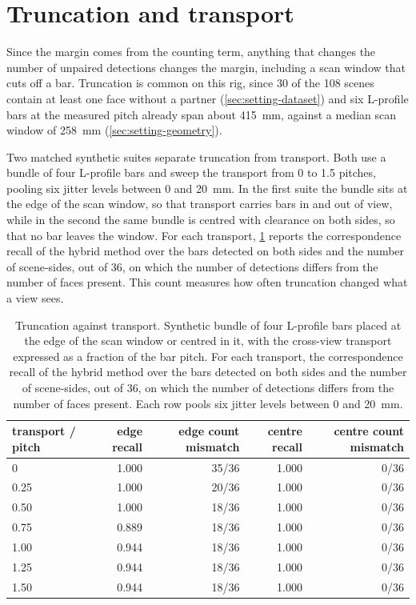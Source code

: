 \documentclass[a4paper, 12pt, twoside]{book}
\begin{document}
\section{Truncation and transport}
\label{sec:ambiguity-truncation}

Since the margin comes from the counting term, anything that changes the number of unpaired detections changes the margin, including a scan window that cuts off a bar. Truncation is common on this rig, since 30 of the 108 scenes contain at least one face without a partner (\cref{sec:setting-dataset}) and six L-profile bars at the measured pitch already span about 415~mm, against a median scan window of 258~mm (\cref{sec:setting-geometry}).

Two matched synthetic suites separate truncation from transport. Both use a bundle of four L-profile bars and sweep the transport from 0 to 1.5 pitches, pooling six jitter levels between 0 and 20~mm. In the first suite the bundle sits at the edge of the scan window, so that transport carries bars in and out of view, while in the second the same bundle is centred with clearance on both sides, so that no bar leaves the window. For each transport, \cref{tab:placement} reports the correspondence recall of the hybrid method over the bars detected on both sides and the number of scene-sides, out of 36, on which the number of detections differs from the number of faces present. This count measures how often truncation changed what a view sees.

\begin{table}[htbp]
\centering
\caption[Truncation against transport]{Truncation against transport. Synthetic bundle of four L-profile bars placed at the edge of the scan window or centred in it, with the cross-view transport expressed as a fraction of the bar pitch. For each transport, the correspondence recall of the hybrid method over the bars detected on both sides and the number of scene-sides, out of 36, on which the number of detections differs from the number of faces present. Each row pools six jitter levels between 0 and 20~mm.}
\label{tab:placement}
\begin{tabular}{@{}lrrrr@{}}
\toprule
transport / pitch & edge recall & edge count mismatch & centre recall & centre count mismatch \\
\midrule
0 & 1.000 & 35/36 & 1.000 & 0/36 \\
0.25 & 1.000 & 20/36 & 1.000 & 0/36 \\
0.50 & 1.000 & 18/36 & 1.000 & 0/36 \\
0.75 & 0.889 & 18/36 & 1.000 & 0/36 \\
1.00 & 0.944 & 18/36 & 1.000 & 0/36 \\
1.25 & 0.944 & 18/36 & 1.000 & 0/36 \\
1.50 & 0.944 & 18/36 & 1.000 & 0/36 \\
\bottomrule
\end{tabular}
\end{table}
\end{document}
